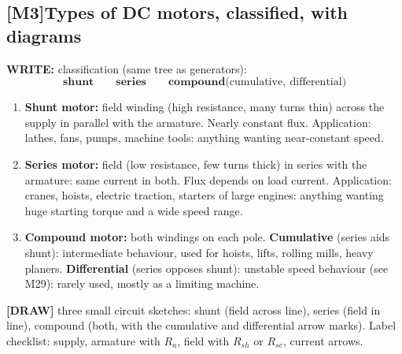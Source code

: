 \documentclass[11pt]{article}
\newcommand{\q}[2]{\subsection*{\color{copper}#1\quad\color{iron}#2}}
\newcommand{\w}[1]{\textbf{\color{copper}WRITE:} #1}
\newcommand{\dw}[1]{\textbf{\color{muted}[DRAW]} #1}
\begin{document}
\q{[M3]}{Types of DC motors, classified, with diagrams}
\w{classification (same tree as generators):}
\[
\textbf{shunt}\qquad\textbf{series}\qquad\textbf{compound} \big( \text{cumulative},\ \text{differential} \big)
\]
\begin{enumerate}[label=\arabic*.]
\item \textbf{Shunt motor:} field winding (high resistance, many turns thin) across the supply in parallel with the armature. Nearly constant flux. Application: lathes, fans, pumps, machine tools: anything wanting near-constant speed.
\item \textbf{Series motor:} field (low resistance, few turns thick) in series with the armature: same current in both. Flux depends on load current. Application: cranes, hoists, electric traction, starters of large engines: anything wanting huge starting torque and a wide speed range.
\item \textbf{Compound motor:} both windings on each pole. \textbf{Cumulative} (series aids shunt): intermediate behaviour, used for hoists, lifts, rolling mills, heavy planers. \textbf{Differential} (series opposes shunt): unstable speed behaviour (see M29): rarely used, mostly as a limiting machine.
\end{enumerate}
\dw{three small circuit sketches: shunt (field across line), series (field in line), compound (both, with the cumulative and differential arrow marks). Label checklist: supply, armature with $R_a$, field with $R_{sh}$ or $R_{se}$, current arrows.}
\end{document}
